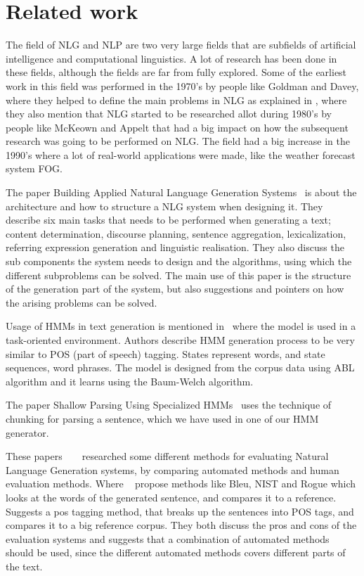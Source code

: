 \documentclass[a4paper,12pt]{article}
\begin{document}
\section{Related work}
\label{sec:relwork}

The field of NLG and NLP are two very large fields that are subfields of
artificial intelligence and computational linguistics. A lot of research has
been done in these fields, although the fields are far from fully explored. Some
of the earliest work in this field was performed in the 1970's by people like
Goldman and Davey, where they helped to define the main problems in NLG 
as explained in \cite[p.~19-20]{buildingNLG}, where they also mention that NLG
started to be researched allot during 1980's by people like McKeown and Appelt
that had a big impact on how the subsequent research was going to be performed on NLG.
The field had a big increase in the 1990's where a lot of real-world applications were made,
like the weather forecast system FOG.

The paper Building Applied Natural Language Generation
Systems~\cite{nlgsystem01} is about the architecture and how to structure a
NLG system when designing it. They describe six main tasks that needs to be
performed when generating a text; content determination, discourse planning,
sentence aggregation, lexicalization, referring expression generation and
linguistic realisation. They also discuss the sub components the system
needs to design and the algorithms, using which the different subproblems can be
solved. The main use of this paper is the structure of the generation part of
the system, but also suggestions and pointers on how the arising problems can be
solved.

Usage of HMMs in text generation is mentioned in~\cite{hmmnlg} where the model
is used in a task-oriented environment. Authors describe HMM generation process
to be very similar to POS (part of speech) tagging. States represent words, and
state sequences, word phrases. The model is designed from the corpus data
using ABL algorithm and it learns using the Baum-Welch algorithm.

The paper Shallow Parsing Using Specialized HMMs~\cite{hmmchunk} uses the technique
of chunking for parsing a sentence, which we have used in one of our HMM generator.

These papers  ~\cite{poseval} ~\cite{bleueval} researched some different methods for evaluating Natural Language Generation systems, by comparing automated methods and human evaluation methods. Where  ~\cite{bleueval} propose methods like Bleu, NIST and Rogue which looks at the words of the generated sentence, and compares it to a reference. ~\cite{poseval} Suggests a pos tagging method, that breaks up the sentences into POS tags, and compares it to a big reference corpus.
They both discuss the pros and cons of the evaluation systems and suggests that a combination of automated methods should be used, since the different automated methods covers different parts of the text.
\end{document}
